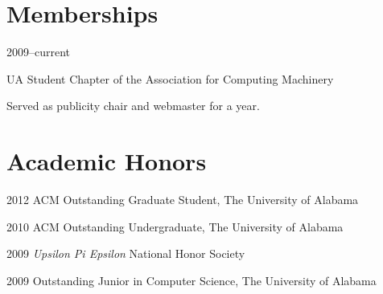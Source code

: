 \documentclass[11pt]{simplecv}
\begin{document}
\section{Memberships} 

\begin{topic}

\item[2009--current] {
  UA Student Chapter of the Association for Computing Machinery
  
  Served as publicity chair and webmaster for a year.
}

\end{topic}


\section{Academic Honors} 
\begin{topic}
  \item [2012] { ACM Outstanding Graduate Student, The University of Alabama }
  \item [2010] { ACM Outstanding Undergraduate, The University of Alabama }
  \item [2009] { \textit{Upsilon Pi Epsilon} National Honor Society }
  \item [2009] { Outstanding Junior in Computer Science, The University of Alabama }
\end{topic}


\nocite{*}


\end{document}
